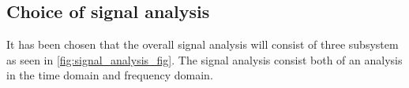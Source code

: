 





\subsection{Choice of signal analysis}
It has been chosen that the overall signal analysis will consist of three subsystem as seen in \autoref{fig:signal_analysis_fig}. The signal analysis consist both of an analysis in the time domain and frequency domain.

